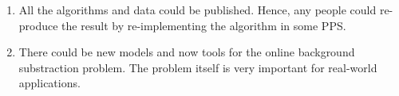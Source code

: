 \begin{enumerate}[i]
\item All the algorithms and data could be published. Hence, any people could re-produce the result by re-implementing the algorithm in some PPS.
\item There could be new models and now tools for the online background substraction problem. The problem itself is very important for real-world applications.
\end{enumerate} 